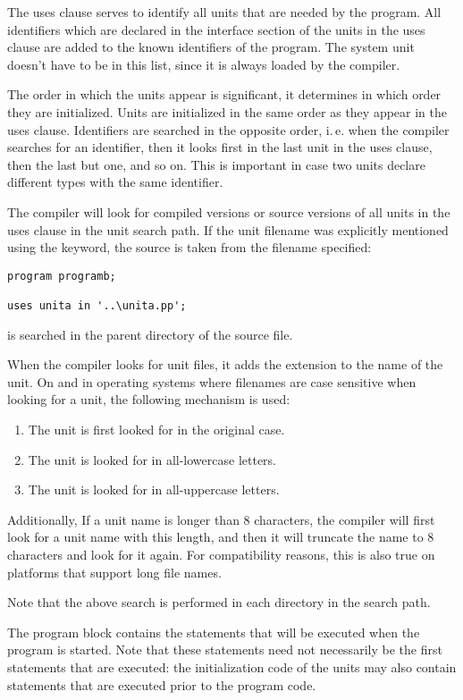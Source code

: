 The uses clause serves to identify all units that are needed by the program.
All identifiers which are declared in the interface section of the units
in the uses clause are added to the known identifiers of the program.
The system unit doesn't have to be in this list, since it is always loaded
by the compiler.

The order in which the units appear is significant, it determines in
which order they are initialized. Units are initialized in the same order
as they appear in the uses clause. Identifiers are searched in the opposite
order, i.\,e. when the compiler searches for an identifier, then it looks
first in the last unit in the uses clause, then the last but one, and so on.
This is important in case two units declare different types with the same
identifier.

The compiler will look for compiled versions or source versions of all
units in the uses clause in the unit search path. If the unit filename was
explicitly mentioned using the  keyword, the source is taken from
the filename specified:
\begin{verbatim}
program programb;

uses unita in '..\unita.pp';
\end{verbatim}
 is searched in the parent directory of the  source
file.


When the compiler looks for unit files, it adds the extension 
to the name of the unit. On \linux and in operating systems where filenames
are case sensitive  when looking for a unit, the following mechanism is
used:
\begin{enumerate}
\item The unit is first looked for in the original case.
\item The unit is looked for in all-lowercase letters.
\item The unit is looked for in all-uppercase letters.
\end{enumerate}
Additionally, If a unit name is longer than 8 characters, the compiler
will first look for a unit name with this length, and then it will
truncate the name to 8 characters and look for it again.
For compatibility reasons, this is also true on platforms that
support long file names.

Note that the above search is performed in each directory in the search
path.

The program block contains the statements that will be executed when the
program is started. Note that these statements need not necessarily be the
first statements that are executed: the initialization code of the units
may also contain statements that are executed prior to the program code.

